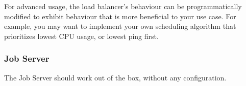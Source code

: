 For advanced usage, the load balancer's behaviour can
be programmatically modified to exhibit behaviour that is
more beneficial to your use case.
For example, you may want to implement your own scheduling
algorithm that prioritizes lowest CPU usage, or lowest ping
first.

\subsubsection{Job Server}

The Job Server should work out of the box, without any configuration.

